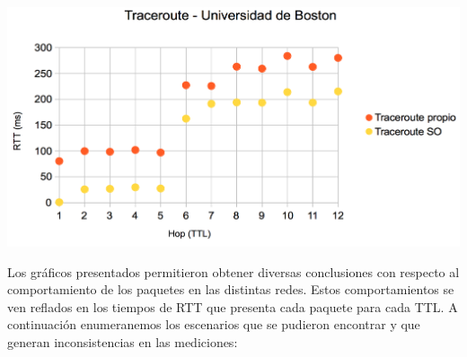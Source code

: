 \centerline{\includegraphics[width=1\textwidth]{imagenes/1ra_parte/EEUU_1ergrafico.png}}

Los gráficos presentados permitieron obtener diversas conclusiones con respecto al comportamiento de los paquetes en las distintas redes. Estos comportamientos se ven reflados en los tiempos de RTT que presenta cada paquete para cada TTL. A continuación enumeranemos los escenarios que se pudieron encontrar y que generan inconsistencias en las mediciones:
